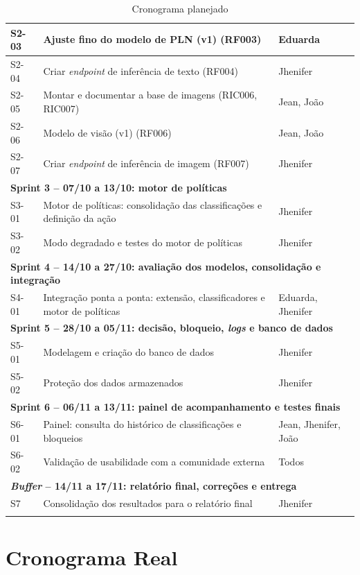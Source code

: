 \documentclass[
    12pt,           %
    oneside,        %
    a4paper,        %
    chapter=TITLE,  %
    english,        %
    brazil          %
]{abntex2}
\begin{document}
{\begin{longtable}{|p{1.5cm}|p{9.0cm}|p{3.3cm}|}
S2-03 & Ajuste fino do modelo de PLN (v1) (RF003) & Eduarda \\ \hline
S2-04 & Criar \textit{endpoint} de inferência de texto (RF004) & Jhenifer \\ \hline
S2-05 & Montar e documentar a base de imagens (RIC006, RIC007) & Jean, João \\ \hline
S2-06 & Modelo de visão (v1) (RF006) & Jean, João \\ \hline
S2-07 & Criar \textit{endpoint} de inferência de imagem (RF007) & Jhenifer \\ \hline
\multicolumn{3}{|l|}{\textbf{Sprint 3 -- 07/10 a 13/10: motor de políticas}} \\ \hline
S3-01 & Motor de políticas: consolidação das classificações e definição da ação & Jhenifer \\ \hline
S3-02 & Modo degradado e testes do motor de políticas & Jhenifer \\ \hline
\multicolumn{3}{|l|}{\textbf{Sprint 4 -- 14/10 a 27/10: avaliação dos modelos, consolidação e integração}} \\ \hline
S4-01 & Integração ponta a ponta: extensão, classificadores e motor de políticas & Eduarda, Jhenifer \\ \hline
\multicolumn{3}{|l|}{\textbf{Sprint 5 -- 28/10 a 05/11: decisão, bloqueio, \textit{logs} e banco de dados}} \\ \hline
S5-01 & Modelagem e criação do banco de dados & Jhenifer \\ \hline
S5-02 & Proteção dos dados armazenados & Jhenifer \\ \hline
\multicolumn{3}{|l|}{\textbf{Sprint 6 -- 06/11 a 13/11: painel de acompanhamento e testes finais}} \\ \hline
S6-01 & Painel: consulta do histórico de classificações e bloqueios & Jean, Jhenifer, João \\ \hline
S6-02 & Validação de usabilidade com a comunidade externa & Todos \\ \hline
\multicolumn{3}{|l|}{\textbf{\textit{Buffer} -- 14/11 a 17/11: relatório final, correções e entrega}} \\ \hline
S7 & Consolidação dos resultados para o relatório final & Jhenifer \\ \hline
\caption{Cronograma planejado}
\label{tab:cronograma-planejado}
\end{longtable}
}

\section{Cronograma Real}
\end{document}
